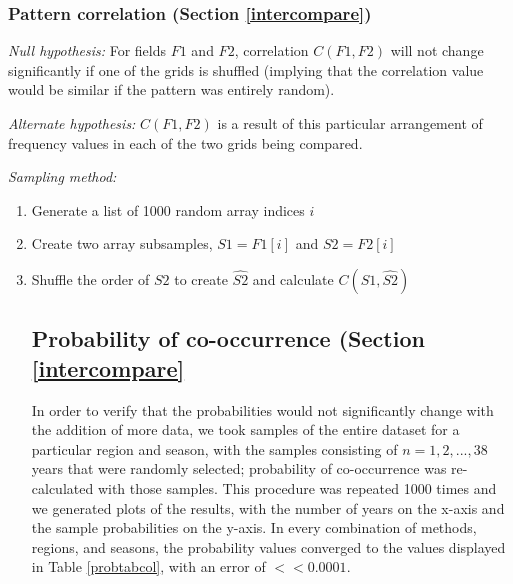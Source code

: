 \documentclass[smallextended]{svjour3}       %
\numberwithin{equation}{section}
\begin{document}
\begin{appendices}
\subsubsection{Pattern correlation (Section \ref{intercompare})}
\textit{Null hypothesis:} For fields $F1$ and $F2$, correlation $C(F1,F2)$ will not change significantly if one of the grids is shuffled (implying that the correlation value would be similar if the pattern was entirely random).

\noindent\textit{Alternate hypothesis:} $C(F1,F2)$ is a result of this particular arrangement of frequency values in each of the two grids being compared.

\noindent\textit{Sampling method:}\begin{enumerate}
    \item Generate a list of 1000 random array indices $i$
        \item Create two array subsamples, $S1=F1[i]$ and $S2=F2[i]$
        \item Shuffle the order of $S2$ to create $\widehat{S2}$ and calculate $C(S1,\widehat{S2})$
        
\subsection{Probability of co-occurrence (Section \ref{intercompare}}

In order to verify that the probabilities would not significantly change with the addition of more data, we took samples of the entire dataset for a particular region and season, with the samples consisting of $n={1,2,...,38}$ years that were randomly selected; probability of co-occurrence was re-calculated with those samples. This procedure was repeated 1000 times and we generated plots of the results, with the number of years on the x-axis and the sample probabilities on the y-axis. In every combination of methods, regions, and seasons, the probability values converged to the values displayed in Table \ref{probtabcol}, with an error of $<<0.0001$. 
\end{enumerate}




\end{appendices}




\pagebreak
\end{document}
